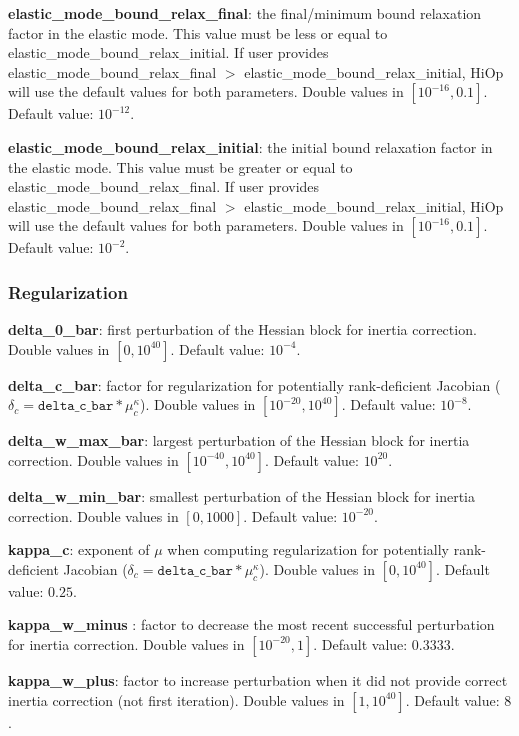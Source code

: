 \noindent \textbf{elastic\_mode\_bound\_relax\_final}: the final/minimum bound relaxation factor in the elastic mode. This value must be less or equal to elastic\_mode\_bound\_relax\_initial. If user provides elastic\_mode\_bound\_relax\_final $>$ elastic\_mode\_bound\_relax\_initial, HiOp will use the default values for both parameters. Double values in $[10^{-16}, 0.1]$. Default value: $10^{-12}$.
\medskip

\noindent \textbf{elastic\_mode\_bound\_relax\_initial}: the initial bound relaxation factor in the elastic mode. This value must be greater or equal to elastic\_mode\_bound\_relax\_final. If user provides elastic\_mode\_bound\_relax\_final $>$ elastic\_mode\_bound\_relax\_initial, HiOp will use the default values for both parameters. Double values in $[10^{-16}, 0.1]$. Default value: $10^{-2}$.
\medskip



\subsubsection{Regularization}

\noindent \textbf{delta\_0\_bar}: first perturbation of the Hessian block for inertia correction. Double values in $[0,10^{40}]$. Default value: $10^{-4}$. 
\medskip

\noindent \textbf{delta\_c\_bar}: factor for regularization for potentially rank-deficient Jacobian ($\delta_c=\texttt{delta\_c\_bar}*\mu^\kappa_c$). Double values in $[10^{-20},10^{40}]$. Default value: $10^{-8}$. 
\medskip

\noindent \textbf{delta\_w\_max\_bar}: largest perturbation of the Hessian block for inertia correction. Double values in $[10^{-40},10^{40}]$. Default value: $10^{20}$. 
\medskip

\noindent \textbf{delta\_w\_min\_bar}: smallest perturbation of the Hessian block for inertia correction. Double values in $[0,1000]$. Default value: $10^{-20}$. 
\medskip

\noindent \textbf{kappa\_c}: exponent of $\mu$ when computing regularization for potentially rank-deficient Jacobian ($\delta_c=\texttt{delta\_c\_bar}*\mu^\kappa_c$). Double values in $[0,10^{40}]$. Default value: $0.25$. 
\medskip

\noindent \textbf{kappa\_w\_minus }: factor to decrease the most recent successful perturbation for inertia correction. Double values in $[10^{-20}, 1]$. Default value: $0.3333$.
\medskip

\noindent \textbf{kappa\_w\_plus}: factor to increase perturbation when it did not provide correct inertia correction (not first iteration). Double values in $[1, 10^{40}]$. Default value: $8$.
\medskip

